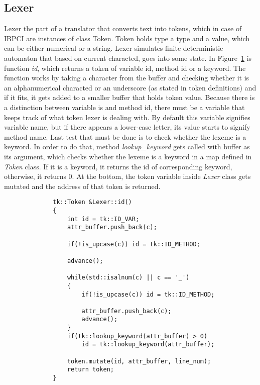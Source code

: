 \documentclass[12pt]{article}
\begin{document}
\subsection*{Lexer}
Lexer  the part of a translator that converts text into tokens, which in case of 
IBPCI are instances of class Token. Token holds type a type and a value, which can
be either numerical or a string. Lexer simulates finite deterministic automaton that
based on current characted, goes into some state. In Figure~\ref{snip_1} is function
\emph{id}, which returns a token of variable id, method id or a keyword. The function
works by taking a character from the buffer and checking whether it is an alphanumerical
characted or an underscore (as stated in token definitions) and if it fits, it gets added
to a smaller buffer that holds token value. Because there is a distinction between
variable is and method id, there must be a variable that keeps track of what token lexer
is dealing with. By default this variable signifies variable name, but if there appears
a lower-case letter, its value starts to signify method name. Last test that must be
done is to check whether the lexeme is a keyword. In order to do that, method 
\emph{lookup\_keyword} gets called with buffer as its argument, which checks whether
the lexeme is a keyword in a map defined in \emph{Token} class. If it is a keyword, 
it returns the id of corresponding keyword, otherwise, it returns 0. At the bottom, 
the token variable inside \emph{Lexer} class gets mutated and the address of that
token is returned.
\begin{figure}[H]
    \caption{}
    \label{snip_1}
    \begin{verbatim}
        tk::Token &Lexer::id()
        {
            int id = tk::ID_VAR;
            attr_buffer.push_back(c);

            if(!is_upcase(c)) id = tk::ID_METHOD;

            advance();

            while(std::isalnum(c) || c == '_')
            {
                if(!is_upcase(c)) id = tk::ID_METHOD;

                attr_buffer.push_back(c);
                advance();
            }
            if(tk::lookup_keyword(attr_buffer) > 0)
                id = tk::lookup_keyword(attr_buffer);

            token.mutate(id, attr_buffer, line_num);
            return token;
        }   
    \end{verbatim}
\end{figure}
\end{document}
